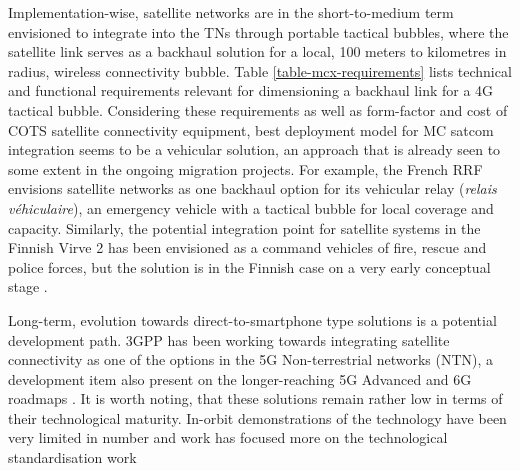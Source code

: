 \documentclass[english, 12pt, a4paper, elec, utf8, a-1b, online]{aaltothesis}
\begin{document}
Implementation-wise, satellite networks are in the short-to-medium term envisioned to integrate into the TNs through portable tactical bubbles, where the satellite link serves as a backhaul solution for a local, 100 meters to kilometres in radius, wireless connectivity bubble.
Table \ref{table-mcx-requirements} lists technical and functional requirements relevant for dimensioning a backhaul link for a 4G tactical bubble.
Considering these requirements as well as form-factor and cost of COTS satellite connectivity equipment, best deployment model for MC satcom integration seems to be a vehicular solution, an approach that is already seen to some extent in the ongoing migration projects.
For example, the French RRF envisions satellite networks as one backhaul option for its vehicular relay (\textit{relais véhiculaire}), an emergency vehicle with a tactical bubble for local coverage and capacity.
Similarly, the potential integration point for satellite systems in the Finnish Virve 2 has been envisioned as a command vehicles of fire, rescue and police forces, but the solution is in the Finnish case on a very early conceptual stage \cite{kokkoniemitarkkanen2024missioncritical,saynevirta2021satellite,dominguez2021resilience}. 

Long-term, evolution towards direct-to-smartphone type solutions is a potential development path. 3GPP has been working towards integrating satellite connectivity as one of the options in the 5G Non-terrestrial networks (NTN), a development item also present on the longer-reaching 5G Advanced and 6G roadmaps \cite{6G_ROADMAP, 3GPP_NTN_PAPERS}. It is worth noting, that these solutions remain rather low in terms of their technological maturity. In-orbit demonstrations of the technology have been very limited in number and work has focused more on the technological standardisation work %
\end{document}
